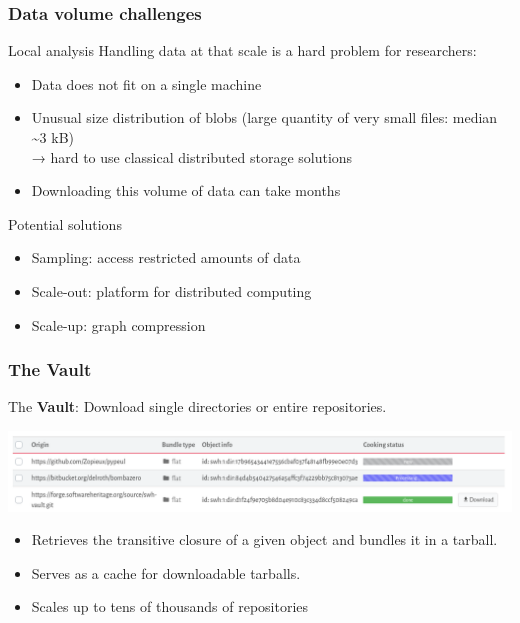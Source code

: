 \documentclass[aspectratio=169,xcolor=table]{beamer}
\begin{document}
    \begin{frame}
        \frametitle{Data volume challenges}

        \begin{block}{Local analysis}
            Handling data at that scale is a hard problem for researchers:
            \begin{itemize}
                \item Data does not fit on a single machine
                \item Unusual size distribution of blobs (large quantity
                    of very small files: median \textasciitilde{}3 kB) \\
                    → hard to use classical distributed storage solutions
                \item Downloading this volume of data can take months
            \end{itemize}
        \end{block}

        \begin{block}{Potential solutions}
            \begin{itemize}
                \item Sampling: access restricted amounts of data
                \item Scale-out: platform for distributed computing
                \item Scale-up: graph compression
            \end{itemize}
        \end{block}
    \end{frame}

    \begin{frame}
        \frametitle{The Vault}

        \begin{block}{}
            The \textbf{Vault}: Download single directories or entire
            repositories.
        \end{block}

        \begin{center}
            \includegraphics[width=\linewidth]{img/vault.png}
        \end{center}

        \begin{block}{}
            \begin{itemize}
                \item Retrieves the transitive closure of a
                    given object and bundles it in a tarball.
                \item Serves as a cache for downloadable tarballs.
                \item Scales up to tens of thousands of repositories
            \end{itemize}
        \end{block}
    \end{frame}
\end{document}
